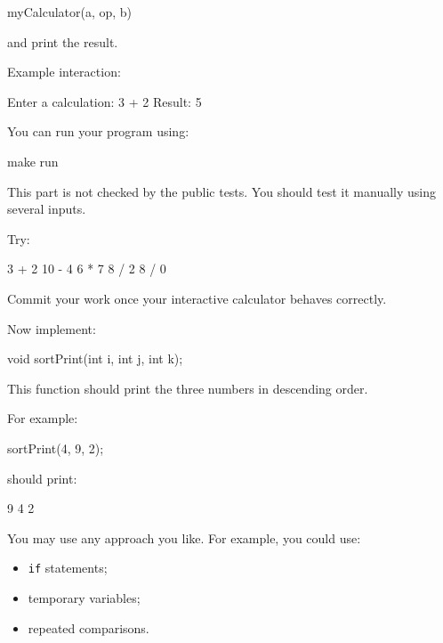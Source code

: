 \documentclass{csc2059practical}
\begin{document}
\begin{cppcode}
myCalculator(a, op, b)
\end{cppcode}

and print the result.

Example interaction:

\begin{terminal}
Enter a calculation: 3 + 2
Result: 5
\end{terminal}

You can run your program using:

\begin{bashcode}
make run
\end{bashcode}

\begin{importantnote}
This part is not checked by the public tests. You should test it manually using several inputs.
\end{importantnote}

Try:

\begin{terminal}
3 + 2
10 - 4
6 * 7
8 / 2
8 / 0
\end{terminal}

Commit your work once your interactive calculator behaves correctly.


Now implement:

\begin{cppcode}
void sortPrint(int i, int j, int k);
\end{cppcode}

This function should print the three numbers in descending order.

For example:

\begin{cppcode}
sortPrint(4, 9, 2);
\end{cppcode}

should print:

\begin{terminal}
9 4 2
\end{terminal}

You may use any approach you like. For example, you could use:

\begin{itemize}
  \item \texttt{if} statements;
  \item temporary variables;
  \item repeated comparisons.
\end{itemize}
\end{document}
